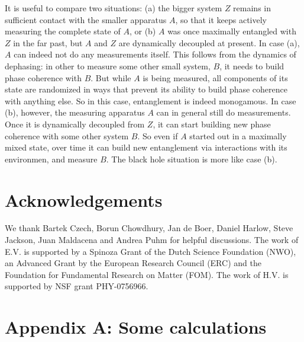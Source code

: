 \documentclass[12pt]{article}%
\begin{document}
It is useful to compare two situations: (a) the bigger system $Z$ remains in sufficient contact with the smaller apparatus
$A$, so that it keeps actively measuring the complete state of $A$,
or (b) $A$ was once maximally entangled with $Z$ in the far past, but $A$ and $Z$ are dynamically decoupled at present.
In  case (a),  $A$ can indeed not do any measurements itself. This follows from the dynamics of dephasing: in other
to measure some other small system, $B$, it needs to build phase coherence with $B$. But while $A$ is being measured, all components of 
its state are randomized in ways that prevent its ability to build phase coherence with anything else. So in this case, entanglement is indeed
monogamous. In case (b), however, the measuring apparatus $A$ can in general still do measurements. Once it is dynamically decoupled 
from $Z$, it can start building  new phase coherence with some other system $B$. So  even if $A$ started out in a maximally mixed state, 
over time it can build new entanglement via interactions with its environmen, and measure $B$. The black hole situation is more like case (b).

\section*{Acknowledgements}

We thank  Bartek Czech,  Borun Chowdhury, Jan de Boer, Daniel Harlow, Steve Jackson, Juan Maldacena and Andrea Puhm for
helpful discussions.   The work of E.V. is supported by a Spinoza Grant of the Dutch Science Foundation (NWO), an Advanced Grant by the European Research Council (ERC) and the Foundation for Fundamental Research on Matter (FOM). The work of H.V. is supported by NSF grant PHY-0756966.

\bigskip

\appendix

\section*{Appendix A: Some calculations}
\end{document}
